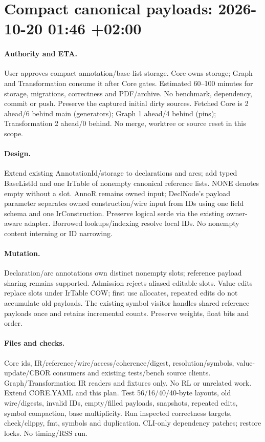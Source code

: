 \documentclass[11pt,a4paper]{article}
\begin{document}
\clearpage\section*{Compact canonical payloads: 2026-10-20 01:46 +02:00}
\paragraph{Authority and ETA.} User approves compact annotation/base-list storage.
Core owns storage; Graph and Transformation consume it after Core gates.
Estimated 60--100 minutes for storage, migrations, correctness and PDF/archive.
No benchmark, dependency, commit or push. Preserve the captured initial dirty sources.
Fetched Core is 2 ahead/6 behind main (generators); Graph 1 ahead/4 behind (pins);
Transformation 2 ahead/0 behind. No merge, worktree or source reset in this scope.
\paragraph{Design.} Extend existing AnnotationId/storage to declarations and arcs;
add typed BaseListId and one IrTable of nonempty canonical reference lists.
NONE denotes empty without a slot. AnnoR remains owned input; DeclNode's payload
parameter separates owned construction/wire input from IDs using one field schema
and one IrConstruction. Preserve logical serde via the existing owner-aware adapter.
Borrowed lookups/indexing resolve local IDs. No nonempty content interning or ID narrowing.
\paragraph{Mutation.} Declaration/arc annotations own distinct nonempty slots;
reference payload sharing remains supported. Admission rejects aliased editable slots.
Value edits replace slots under IrTable COW; first use allocates, repeated edits do
not accumulate old payloads. The existing symbol visitor handles shared reference
payloads once and retains incremental counts. Preserve weights, float bits and order.
\paragraph{Files and checks.} Core ids, IR/reference/wire/access/coherence/digest,
resolution/symbols, value-update/CBOR consumers and existing tests/bench source clients.
Graph/Transformation IR readers and fixtures only. No RL or unrelated work.
Extend CORE.YAML and this plan. Test 56/16/40/40-byte layouts, old wire/digests,
invalid IDs, empty/filled payloads, snapshots, repeated edits, symbol compaction,
base multiplicity. Run inspected correctness targets, check/clippy, fmt, symbols
and duplication. CLI-only dependency patches; restore locks. No timing/RSS run.
\end{document}

